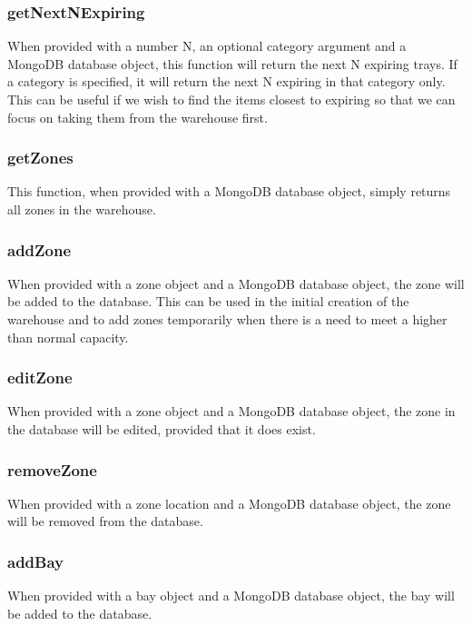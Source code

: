\documentclass[letterpaper,10pt,english]{sphinxmanual}
\begin{document}
\subsubsection{getNextNExpiring}
\label{\detokenize{docs/System_Overview/Backend_overview:getnextnexpiring}}
When provided with a number N, an optional category argument and a
MongoDB database object, this function will return the next N expiring
trays. If a category is specified, it will return the next N expiring in
that category only. This can be useful if we wish to find the items
closest to expiring so that we can focus on taking them from the
warehouse first.


\subsubsection{getZones}
\label{\detokenize{docs/System_Overview/Backend_overview:getzones}}
This function, when provided with a MongoDB database object, simply
returns all zones in the warehouse.


\subsubsection{addZone}
\label{\detokenize{docs/System_Overview/Backend_overview:addzone}}
When provided with a zone object and a MongoDB database object, the zone
will be added to the database. This can be used in the initial creation
of the warehouse and to add zones temporarily when there is a need to
meet a higher than normal capacity.


\subsubsection{editZone}
\label{\detokenize{docs/System_Overview/Backend_overview:editzone}}
When provided with a zone object and a MongoDB database object, the zone
in the database will be edited, provided that it does exist.


\subsubsection{removeZone}
\label{\detokenize{docs/System_Overview/Backend_overview:removezone}}
When provided with a zone location and a MongoDB database object, the
zone will be removed from the database.


\subsubsection{addBay}
\label{\detokenize{docs/System_Overview/Backend_overview:addbay}}
When provided with a bay object and a MongoDB database object, the bay
will be added to the database.
\end{document}

